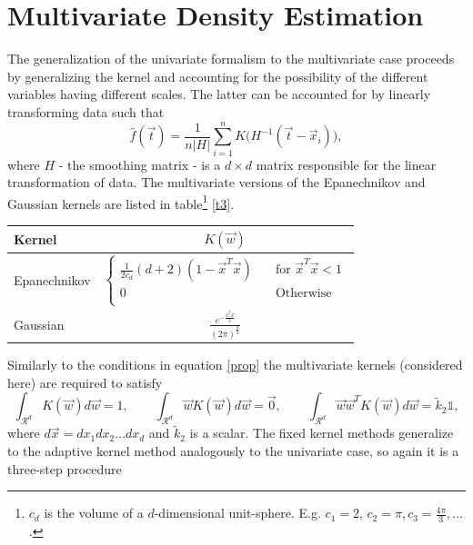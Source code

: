\section{Multivariate Density Estimation}
\label{sec:mul}
\noindent The generalization of the univariate formalism to the multivariate case proceeds by generalizing the kernel and accounting for the possibility of the different variables having different scales. The latter can be accounted for by linearly transforming data such that
\begin{equation}
	\hat{f}(\vec{t})=\frac{1}{n |H|}\sum_{i=1}^nK\big(H^{-1}(\vec{t}-\vec{x}_i)\big),
	\label{resc1}
\end{equation}
where $H$ - the smoothing matrix - is a $d\times d$ matrix responsible for the linear transformation of data. The multivariate versions of the Epanechnikov and Gaussian kernels are listed in table\footnote{$c_d$ is the volume of a $d$-dimensional unit-sphere. E.g. $c_1=2$, $c_2=\pi, c_3=\frac{4\pi}{3},\dots$.} \ref{t3}.
\begin{center}
	\begin{tabular}{ l| c }
		Kernel & $K(\vec{w})$ \\
		\hline
		Epanechnikov & $\begin{cases}
			\frac{1}{2c_d}(d+2)(1-\vec{x}^T\vec{x})&\quad \text{for } \vec{x}^T\vec{x}<1\\
			0&\quad \text{Otherwise}\\
		\end{cases}$ \\
		Gaussian & $\frac{e^{-\frac{\vec{x}^T\vec{x}}{2}}}{(2\pi)^\frac{d}{2}}$ \\
	\end{tabular}
	\captionsetup{width=0.95\textwidth}
	\label{t3}
\end{center}
Similarly to the conditions in equation \eqref{prop} the multivariate kernels (considered here) are required to satisfy\citep{scott}
\begin{equation}
	\int_{\mathcal{R}^d} K(\vec{w})d\vec{w}=1,\qquad \int_{\mathcal{R}^d} \vec{w}K(\vec{w})d\vec{w}=\vec{0},\qquad \int_{\mathcal{R}^d} \vec{w}\vec{w}^TK(\vec{w})d\vec{w}=\tilde{k}_2\mathbb{1},
	\label{prop2}
\end{equation}
where $d\vec{x}=dx_1dx_2\dots dx_d$ and $\tilde{k}_2$ is a scalar. The fixed kernel methods generalize to the adaptive kernel method analogously to the univariate case, so again it is a three-step procedure
